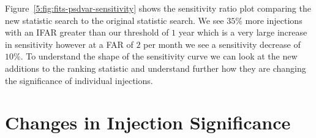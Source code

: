 %
Figure~\ref{5:fig:fits-psdvar-sensitivity} shows the sensitivity ratio plot comparing the new statistic search to the original statistic search. We see $35\%$ more injections with an IFAR greater than our threshold of $1$ year which is a very large increase in sensitivity however at a FAR of $2$ per month we see a sensitivity decrease of $10\%$. To understand the shape of the sensitivity curve we can look at the new additions to the ranking statistic and understand further how they are changing the significance of individual injections.

\section{\label{5:sec:injection-investigations}Changes in Injection Significance}


